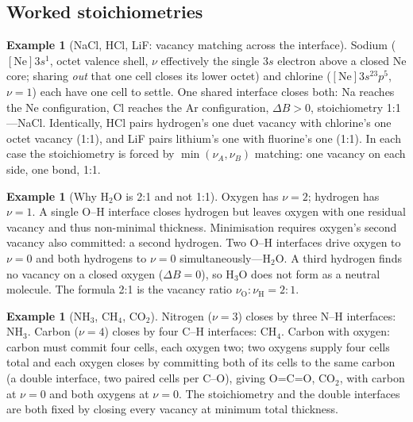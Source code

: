 \documentclass[11pt,twocolumn,a4paper]{article}
\theoremstyle{thmstyle}
\theoremstyle{definition}
\newtheorem{example}[theorem]{Example}
\theoremstyle{remark}
\newcommand{\thick}{B}                 %
\newcommand{\vac}{\nu}                 %
\begin{document}
\subsection{Worked stoichiometries}

\begin{example}[NaCl, HCl, LiF: vacancy matching across the interface]
\label{ex:salts}
Sodium ($[\mathrm{Ne}]3s^1$, octet valence shell, $\vac$ effectively the
single $3s$ electron above a closed Ne core; sharing \emph{out} that one
cell closes its lower octet) and chlorine ($[\mathrm{Ne}]3s^23p^5$,
$\vac=1$) each have one cell to settle. One shared interface closes both:
Na reaches the Ne configuration, Cl reaches the Ar configuration,
$\Delta\thick>0$, stoichiometry 1:1---NaCl. Identically, HCl pairs
hydrogen's one duet vacancy with chlorine's one octet vacancy (1:1), and
LiF pairs lithium's one with fluorine's one (1:1). In each case the
stoichiometry is forced by $\min(\vac_A,\vac_B)$ matching: one vacancy on
each side, one bond, 1:1.
\end{example}

\begin{example}[Why H$_2$O is 2:1 and not 1:1]
\label{ex:water}
Oxygen has $\vac=2$; hydrogen has $\vac=1$. A single O--H interface closes
hydrogen but leaves oxygen with one residual vacancy and thus
non-minimal thickness. Minimisation requires oxygen's second vacancy also
committed: a second hydrogen. Two O--H interfaces drive oxygen to
$\vac=0$ and both hydrogens to $\vac=0$ simultaneously---H$_2$O. A third
hydrogen finds no vacancy on a closed oxygen ($\Delta\thick=0$), so
H$_3$O does not form as a neutral molecule. The formula 2:1 is the
vacancy ratio $\vac_{\mathrm O}:\vac_{\mathrm H}=2:1$.
\end{example}

\begin{example}[NH$_3$, CH$_4$, CO$_2$]
\label{ex:more}
Nitrogen ($\vac=3$) closes by three N--H interfaces: NH$_3$. Carbon
($\vac=4$) closes by four C--H interfaces: CH$_4$. Carbon with oxygen:
carbon must commit four cells, each oxygen two; two oxygens supply four
cells total and each oxygen closes by committing both of its cells to the
same carbon (a double interface, two paired cells per C--O), giving
O=C=O, CO$_2$, with carbon at $\vac=0$ and both oxygens at $\vac=0$. The
stoichiometry and the double interfaces are both fixed by closing every
vacancy at minimum total thickness.
\end{example}
\end{document}
